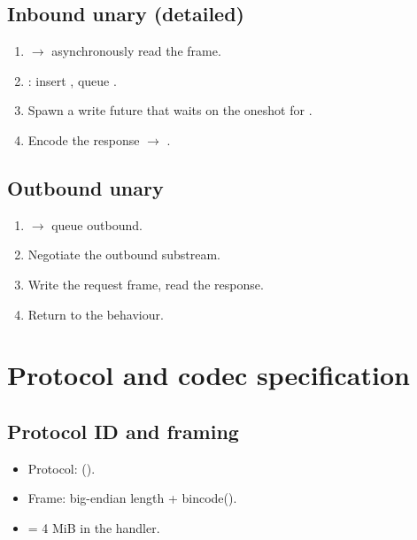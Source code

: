 \subsection{Inbound unary (detailed)}

\begin{enumerate}[label=\arabic*., nosep]
  \item {} $\rightarrow$ asynchronously read the frame.
  \item {}: insert , queue .
  \item Spawn a write future that waits on the oneshot for .
  \item Encode the response $\rightarrow$ .
\end{enumerate}

\subsection{Outbound unary}

\begin{enumerate}[label=\arabic*., nosep]
  \item {} $\rightarrow$ queue outbound.
  \item Negotiate the outbound substream.
  \item Write the request frame, read the response.
  \item Return  to the behaviour.
\end{enumerate}

\section{Protocol and codec specification}

\subsection{Protocol ID and framing}

\begin{itemize}[nosep]
  \item Protocol:  ().
  \item Frame:  big-endian length + bincode().
  \item {} = 4 MiB in the handler.
\end{itemize}

